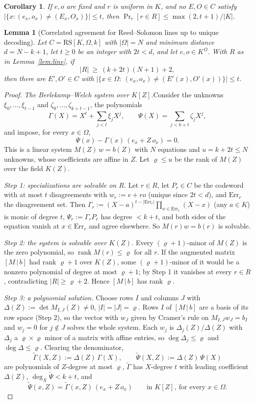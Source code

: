 \documentclass[11pt]{article}
\newtheorem{lemma}[theorem]{Lemma}
\newtheorem{corollary}[theorem]{Corollary}
\theoremstyle{definition}
\newcommand{\K}{K}
\newcommand{\RS}{\mathrm{RS}}
\begin{document}
\begin{corollary}\label{cor:line}
If $e,o$ are fixed and $r$ is uniform in $\K$, and no $E,O\in C$ satisfy $|\{x:(e_x,o_x)\ne(E_x,O_x)\}|\le t$, then $\Pr_r[r\in R]\le\max(2,t+1)/|\K|$.
\end{corollary}

\begin{lemma}[Correlated agreement for Reed--Solomon lines up to unique decoding]\label{lem:rsline}
Let $C=\RS[\K,\Omega,k]$ with $|\Omega|=N$ and minimum distance $d=N-k+1$, let $t\ge0$ be an integer with $2t<d$, and let $e,o\in\K^\Omega$. With $R$ as in Lemma~\ref{lem:line}, if
\[
|R|\ \ge\ (k+2t)(N+1)+2,
\]
then there are $E',O'\in C$ with $|\{x\in\Omega:\ (e_x,o_x)\ne(E'(x),O'(x))\}|\le t$.
\end{lemma}
\begin{proof}
\emph{The Berlekamp--Welch system over $\K[Z]$.}\quad Consider the unknowns $\xi_0,\dots,\xi_{t-1}$ and $\zeta_0,\dots,\zeta_{k+t-1}$, the polynomials
\[
\Gamma(X)=X^t+\sum_{j<t}\xi_jX^j,\qquad \Psi(X)=\sum_{j<k+t}\zeta_jX^j,
\]
and impose, for every $x\in\Omega$,
\[
\Psi(x)-\Gamma(x)\,(e_x+Z\,o_x)=0 .
\]
This is a linear system $M(Z)\,w=b(Z)$ with $N$ equations and $u=k+2t\le N$ unknowns, whose coefficients are affine in $Z$. Let $\varrho\le u$ be the rank of $M(Z)$ over the field $\K(Z)$.

\emph{Step 1: specializations are solvable on $R$.} Let $r\in R$, let $P_r\in C$ be the codeword with at most $t$ disagreements with $w_r:=e+ro$ (unique since $2t<d$), and $\mathrm{Err}_r$ the disagreement set. Then $\Gamma_r:=(X-a)^{t-|\mathrm{Err}_r|}\prod_{x\in\mathrm{Err}_r}(X-x)$ (any $a\in\K$) is monic of degree $t$, $\Psi_r:=\Gamma_rP_r$ has degree $<k+t$, and both sides of the equation vanish at $x\in\mathrm{Err}_r$ and agree elsewhere. So $M(r)w=b(r)$ is solvable.

\emph{Step 2: the system is solvable over $\K(Z)$.} Every $(\varrho+1)$-minor of $M(Z)$ is the zero polynomial, so $\operatorname{rank}M(r)\le\varrho$ for all $r$. If the augmented matrix $[M\,|\,b]$ had rank $\varrho+1$ over $\K(Z)$, some $(\varrho+1)$-minor of it would be a nonzero polynomial of degree at most $\varrho+1$; by Step 1 it vanishes at every $r\in R$, contradicting $|R|\ge\varrho+2$. Hence $[M\,|\,b]$ has rank $\varrho$.

\emph{Step 3: a polynomial solution.} Choose rows $I$ and columns $J$ with $\Delta(Z):=\det M_{I,J}(Z)\ne0$, $|I|=|J|=\varrho$. Rows $I$ of $[M\,|\,b]$ are a basis of its row space (Step 2), so the vector with $w_J$ given by Cramer's rule on $M_{I,J}w_J=b_I$ and $w_j=0$ for $j\notin J$ solves the whole system. Each $w_j$ is $\Delta_j(Z)/\Delta(Z)$ with $\Delta_j$ a $\varrho\times\varrho$ minor of a matrix with affine entries, so $\deg\Delta_j\le\varrho$ and $\deg\Delta\le\varrho$. Clearing the denominator,
\[
\widetilde\Gamma(X,Z):=\Delta(Z)\,\Gamma(X),\qquad \widetilde\Psi(X,Z):=\Delta(Z)\,\Psi(X)
\]
are polynomials of $Z$-degree at most $\varrho$, $\widetilde\Gamma$ has $X$-degree $t$ with leading coefficient $\Delta(Z)$, $\deg_X\widetilde\Psi<k+t$, and
\[
\widetilde\Psi(x,Z)=\widetilde\Gamma(x,Z)\,(e_x+Z\,o_x)\qquad\text{in }\K[Z],\ \text{for every }x\in\Omega. \tag{$\ast$}
\]


\end{proof}
\end{document}
